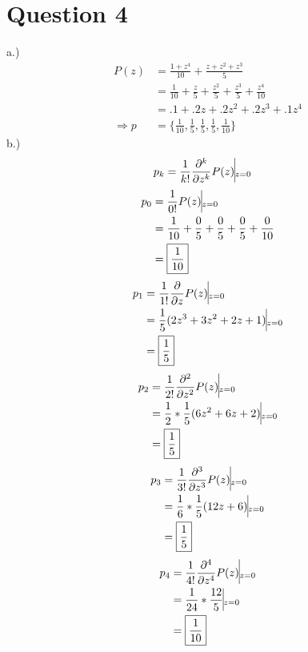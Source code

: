 \documentclass[fleqn]{article}
\newcommand{\nn}[1]{ \begin{align*}#1\end{align*}}
\begin{document}
\section*{Question 4}
a.)
\nn{
	P(z) 	&= \frac{1 + z^4}{10} + \frac{z + z^2 + z^3}{5}\\
			&= \frac{1}{10}+\frac{z}{5}+\frac{z^2}{5}+\frac{z^3}{5}+\frac{z^4}{10} \\
			&= .1 + .2z + .2z^2 + .2z^3 + .1z^4\\
	\Rightarrow p&=\{\frac{1}{10},\frac{1}{5},\frac{1}{5},\frac{1}{5},\frac{1}{10}\} 
} 
b.)
\nn{
	p_k		&= \frac{1}{k!}\frac{\partial^k}{\partial z^k}P(z)\vline_{z=0}
}\nn{
	p_0 	&= \frac{1}{0!}P(z)\vline_{z=0}\\
			&= \frac{1}{10}+\frac{0}{5}+\frac{0}{5}+\frac{0}{5}+\frac{0}{10}\\
			&= \boxed{\frac{1}{10}}
}\nn{
	p_1		&= \frac{1}{1!}\frac{\partial}{\partial z}P(z)\vline_{z=0}\\
			&= \frac{1}{5}(2z^3 + 3z^2 + 2z + 1)\vline_{z=0}\\
			&= \boxed{\frac{1}{5}}
}\nn{
	p_2 	&= \frac{1}{2!}\frac{\partial^2}{\partial z^2}P(z)\vline_{z=0}\\
			&= \frac{1}{2}*\frac{1}{5}(6z^2 + 6z + 2)\vline_{z=0}\\
			&= \boxed{\frac{1}{5}}
}\nn{
	p_3		&= \frac{1}{3!}\frac{\partial^3}{\partial z^3}P(z)\vline_{z=0}\\
			&= \frac{1}{6}*\frac{1}{5}(12z + 6)\vline_{z=0}\\
			&= \boxed{\frac{1}{5}}
}\nn{
	p_4		&= \frac{1}{4!}\frac{\partial^4}{\partial z^4}P(z)\vline_{z=0}\\
			&= \frac{1}{24}*\frac{12}{5}\vline_{z=0}\\
			&= \boxed{\frac{1}{10}}
}
\end{document}

